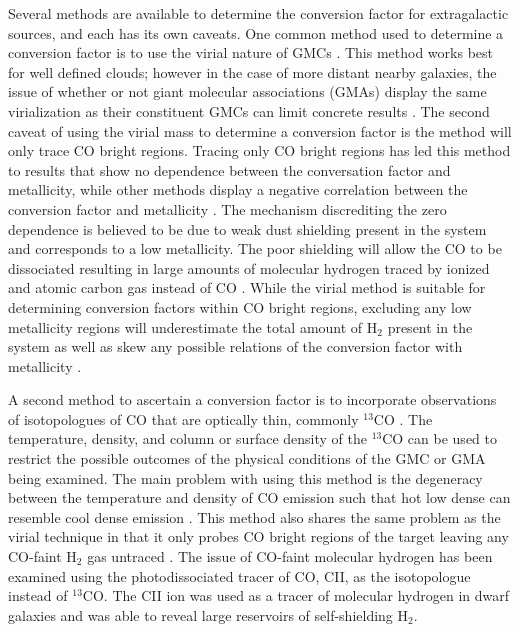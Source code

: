 Several methods are available to determine the conversion factor for extragalactic sources, and each has its own caveats.  One common method used to determine a conversion factor is to use the virial nature of GMCs \citep{bolatto2013}.  This method works best for well defined clouds; however in the case of more distant nearby galaxies, the issue of whether or not giant molecular associations (GMAs) display the same virialization as their constituent GMCs can limit concrete results \citep{bolatto2013}.  The second caveat of using the virial mass to determine a conversion factor is the method will only trace CO bright regions.   Tracing only CO bright regions has led this method to results that show no dependence between the conversation factor and metallicity, while other methods display a negative correlation between the conversion factor and metallicity  \citep{bolatto2013}.   The mechanism discrediting the zero dependence is believed to be due to weak dust shielding present in the system and corresponds to a low metallicity.  The poor shielding will allow the CO to be dissociated resulting in large amounts of molecular hydrogen traced by ionized and atomic carbon gas instead of CO \citep{bolatto2013}.  While the virial method is suitable for determining conversion factors within CO bright regions, excluding any low metallicity regions will underestimate the total amount of H$_2$ present in the system as well as skew any possible relations of the conversion factor with metallicity \citep{bolatto2013}.

A second method to ascertain a conversion factor is to incorporate observations of isotopologues of CO that are optically thin, commonly $^{13}$CO \citep{bolatto2013}.   The temperature, density, and column or surface density of the $^{13}$CO can be used to restrict the possible outcomes of the physical conditions of the GMC or GMA being examined.  The main problem with using this method is the degeneracy between the temperature and density of CO emission such that hot low dense can resemble cool dense emission \citep{rosenberg2014}. This method also shares the same problem as the virial technique in that it only probes CO bright regions of the target leaving any CO-faint H$_2$ gas untraced \citep{bolatto2013}.  The issue of CO-faint molecular hydrogen has been examined using the photodissociated tracer of CO, CII, as the isotopologue instead of $^{13}$CO.  The CII ion was used as a tracer of molecular hydrogen in dwarf galaxies and was able to reveal large reservoirs of self-shielding H$_2$\citep{madden1997}.

